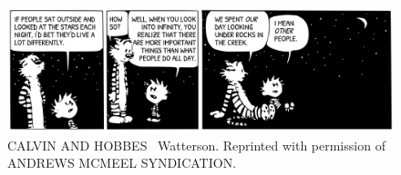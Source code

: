 

\begin{figure}
\begin{center}
  \centerline{\includegraphics[width=1\linewidth]{figures/calvin_and_hobbes.png}}
  \caption*{\tiny CALVIN AND HOBBES \textcopyright\  Watterson. Reprinted with permission of ANDREWS MCMEEL SYNDICATION.}
\end{center}
\end{figure}


